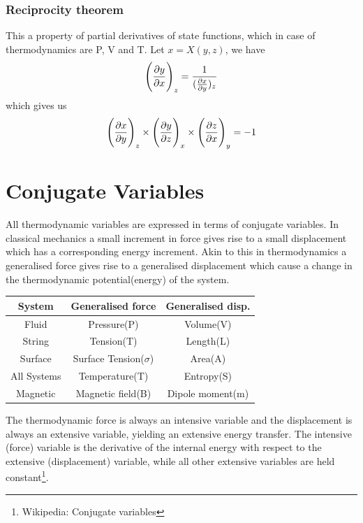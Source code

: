 \documentclass[12pt]{article}
\begin{document}
       \subsubsection{Reciprocity theorem}
       This a property of partial derivatives of state functions, which in case of thermodynamics are P, V and T. Let $x=X(y,z)$, we have
       \begin{equation}
       	\Bigg(\pdv{y}{x}\Bigg)_z=\dfrac{1}{(\pdv{x}{y})_z}
       \end{equation}
       which gives us 
       \begin{equation}
       	\Bigg(\pdv{x}{y}\Bigg)_z\times \Bigg(\pdv{y}{z}\Bigg)_x\times \Bigg(\pdv{z}{x}\Bigg)_y=-1
       \end{equation}
   \pagebreak
\section{Conjugate Variables}
   All thermodynamic variables are expressed in terms of conjugate variables. In classical mechanics a small increment in force gives rise to a small displacement which has a corresponding energy increment. Akin to this in thermodynamics a generalised force gives rise to a generalised displacement which cause a change in the thermodynamic potential(energy) of the system. 
   \begin{center}
   	\begin{tabular}{|c | c | c ||} 
   		\hline
   		System & Generalised force & Generalised disp.  \\ [0.5ex] 
   		\hline\hline
   		Fluid & Pressure(P) & Volume(V) \\ 
   		\hline
   		String & Tension(T) & Length(L) \\
   		\hline
   		Surface & Surface Tension($\sigma$) & Area(A)  \\
   		\hline
   		All Systems & Temperature(T) & Entropy(S) \\
   		\hline
   		Magnetic & Magnetic field(B) & Dipole moment(m) \\ [1ex] 
   		\hline
   	\end{tabular}
   \end{center}
    
    
    The thermodynamic force is always an intensive variable and the displacement is always an extensive variable, yielding an extensive energy transfer. The intensive (force) variable is the derivative of the internal energy with respect to the extensive (displacement) variable, while all other extensive variables are held constant\footnote[2]{Wikipedia: Conjugate variables}. \\
    
\end{document}
